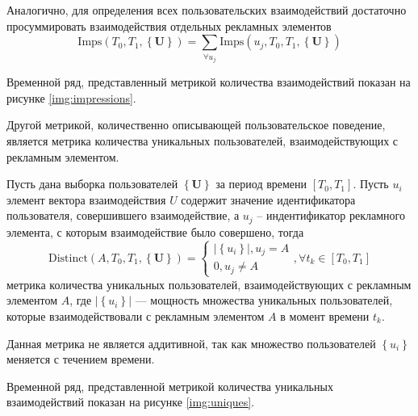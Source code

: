 Аналогично, для определения всех пользовательских взаимодействий достаточно просуммировать взаимодействия отдельных
рекламных элементов
\begin{equation}
    \text{Imps} \left(T_0, T_1, \left\{ \mathbf{U} \right\} \right) =
    \sum \limits_{\forall u_j} \text{Imps} \left(u_j, T_0, T_1, \left\{ \mathbf{U} \right\} \right)
\end{equation}

Временной ряд, представленный метрикой количества взаимодействий показан на рисунке \eqref{img:impressions}.



Другой метрикой, количественно описывающей пользовательское поведение, является метрика количества уникальных пользователей,
взаимодействующих с рекламным элементом.

Пусть дана выборка пользователей $\left\{ \mathbf{U} \right\}$ за период времени $\left[T_0, T_1\right]$. Пусть $u_i$
элемент вектора взаимодействия $U$ содержит значение идентификатора пользователя, совершившего взаимодействие, а $u_j$ -- 
индентификатор рекламного элемента, с которым взаимодействие было совершено, тогда
\begin{equation}
    \text{Distinct}\left( A, T_0, T_1, \left\{\mathbf{U}\right\} \right) =
    \begin{cases}
        \left|\left\{u_i\right\}\right|, u_j = A  \\
        0, u_j \neq A
    \end{cases}, \forall t_k \in \left[T_0, T_1\right]
\end{equation}
метрика количества уникальных пользователей, взаимодействующих с рекламным элементом $A$, где 
$\left|\left\{u_i\right\}\right|$ --- мощность множества уникальных пользователей, которые взаимодействовали с рекламным
элементом $A$ в момент времени $t_k$.

Данная метрика не является аддитивной, так как множество пользователей $\left\{u_i\right\}$ меняется с течением времени.

Временной ряд, представленной метрикой количества уникальных взаимодействий показан на рисунке \eqref{img:uniques}.


